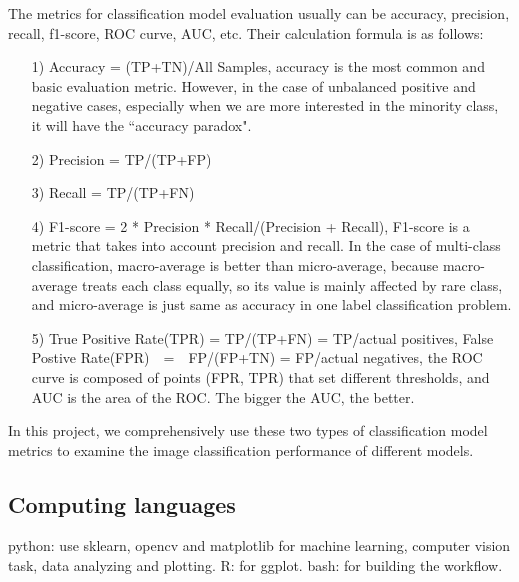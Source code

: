 \documentclass[12pt]{article}
\begin{document}
The metrics for classification model evaluation usually can be accuracy, precision, recall, f1-score, ROC curve, AUC, etc. Their calculation formula is as follows:
\begin{itemize}
\item[1)] Accuracy = (TP+TN)/All Samples, accuracy is the most common and basic evaluation metric. However, in the case of unbalanced positive and negative cases, especially when we are more interested in the minority class, it will have the ``accuracy paradox".
\item[2)] Precision = TP/(TP+FP) 
\item[3)] Recall = TP/(TP+FN)
\item[4)] F1-score = 2 * Precision * Recall/(Precision + Recall), F1-score is a metric that takes into account precision and recall. In the case of multi-class classification, macro-average is better than micro-average, because macro-average treats each class equally, so its value is mainly affected by rare class, and micro-average is just same as accuracy in one label classification problem.
\item[5)] True Positive Rate(TPR) = TP/(TP+FN) = TP/actual positives, False Postive Rate(FPR)　=　FP/(FP+TN) = FP/actual negatives, the ROC curve is composed of points (FPR, TPR) that set different thresholds, and AUC is the area of the ROC. The bigger the AUC, the better.
\end{itemize}

In this project, we comprehensively use these two types of classification model metrics to examine the image classification performance of different models.

\subsection{Computing languages}
python: use sklearn, opencv and matplotlib for machine learning, computer vision task, data analyzing and plotting.
R: for ggplot.
bash: for building the workflow.
\end{document}

